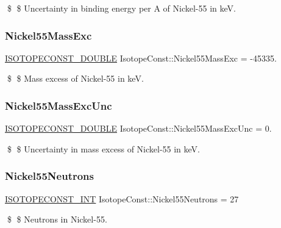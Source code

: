 \$ \$ Uncertainty in binding energy per A of Nickel-\/55 in keV. \mbox{\label{group___isotope_const-_nickel-_ni55_ga74cfd452df4175645e4625f04dd3f398}} 
\subsubsection{\texorpdfstring{Nickel55\+Mass\+Exc}{Nickel55MassExc}}
{\footnotesize\ttfamily \mbox{\hyperlink{group___isotope_const-_macros_ga8f45a7272ce02c0b4c65c44636ed719a}{I\+S\+O\+T\+O\+P\+E\+C\+O\+N\+S\+T\+\_\+\+D\+O\+U\+B\+LE}} Isotope\+Const\+::\+Nickel55\+Mass\+Exc = -\/45335.}

\$ \$ Mass excess of Nickel-\/55 in keV. \mbox{\label{group___isotope_const-_nickel-_ni55_ga69b4b7ba6547ac63d702af05816e6ae7}} 
\subsubsection{\texorpdfstring{Nickel55\+Mass\+Exc\+Unc}{Nickel55MassExcUnc}}
{\footnotesize\ttfamily \mbox{\hyperlink{group___isotope_const-_macros_ga8f45a7272ce02c0b4c65c44636ed719a}{I\+S\+O\+T\+O\+P\+E\+C\+O\+N\+S\+T\+\_\+\+D\+O\+U\+B\+LE}} Isotope\+Const\+::\+Nickel55\+Mass\+Exc\+Unc = 0.}

\$ \$ Uncertainty in mass excess of Nickel-\/55 in keV. \mbox{\label{group___isotope_const-_nickel-_ni55_gaf6ba38f241a0267c8110e3ab36e75a17}} 
\subsubsection{\texorpdfstring{Nickel55\+Neutrons}{Nickel55Neutrons}}
{\footnotesize\ttfamily \mbox{\hyperlink{group___isotope_const-_macros_ga5f18360b3e99483a35c32d789e62621c}{I\+S\+O\+T\+O\+P\+E\+C\+O\+N\+S\+T\+\_\+\+I\+NT}} Isotope\+Const\+::\+Nickel55\+Neutrons = 27}

\$ \$ Neutrons in Nickel-\/55. \mbox{\label{group___isotope_const-_nickel-_ni55_ga4178717c88a60446cca3badc2491c60a}} 
